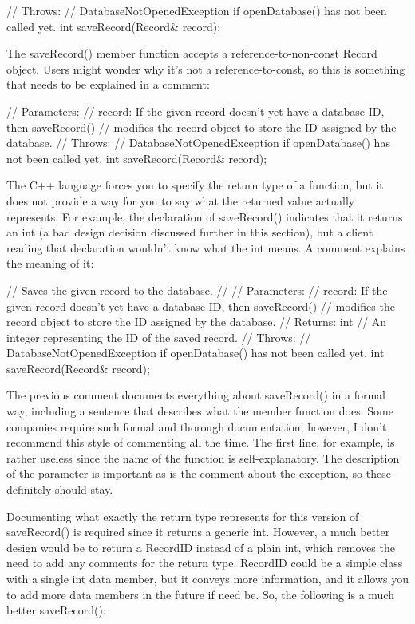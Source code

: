 \begin{cpp}
// Throws:
//    DatabaseNotOpenedException if openDatabase() has not been called yet.
int saveRecord(Record& record);
\end{cpp}

The saveRecord() member function accepts a reference-to-non-const Record object. Users might wonder why it’s not a reference-to-const, so this is something that needs to be explained in a comment:

\begin{cpp}
// Parameters:
//    record: If the given record doesn't yet have a database ID, then saveRecord()
//    modifies the record object to store the ID assigned by the database.
// Throws:
//    DatabaseNotOpenedException if openDatabase() has not been called yet.
int saveRecord(Record& record);
\end{cpp}

The C++ language forces you to specify the return type of a function, but it does not provide a way for you to say what the returned value actually represents. For example, the declaration of saveRecord() indicates that it returns an int (a bad design decision discussed further in this section), but a client reading that declaration wouldn’t know what the int means. A comment explains the meaning of it:

\begin{cpp}
// Saves the given record to the database.
//
// Parameters:
//    record: If the given record doesn't yet have a database ID, then saveRecord()
//    modifies the record object to store the ID assigned by the database.
// Returns: int
//    An integer representing the ID of the saved record.
// Throws:
//    DatabaseNotOpenedException if openDatabase() has not been called yet.
int saveRecord(Record& record);
\end{cpp}

The previous comment documents everything about saveRecord() in a formal way, including a sentence that describes what the member function does. Some companies require such formal and thorough documentation; however, I don’t recommend this style of commenting all the time. The first line, for example, is rather useless since the name of the function is self-explanatory. The description of the parameter is important as is the comment about the exception, so these definitely should stay.

Documenting what exactly the return type represents for this version of saveRecord() is required since it returns a generic int. However, a much better design would be to return a RecordID instead of a plain int, which removes the need to add any comments for the return type. RecordID could be a simple class with a single int data member, but it conveys more information, and it allows you to add more data members in the future if need be. So, the following is a much better saveRecord():

